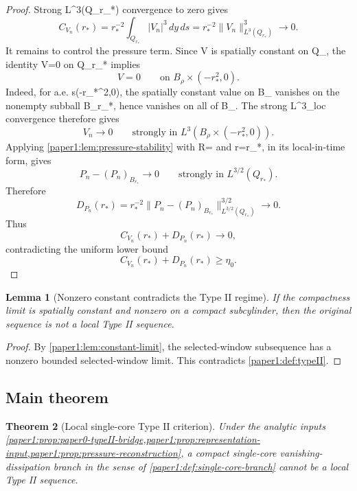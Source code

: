 \documentclass[11pt]{amsart}
\def\({}%
\def\){}%
\theoremstyle{plain}
\newtheorem{theorem}{Theorem}[section]
\newtheorem{lemma}[theorem]{Lemma}
\theoremstyle{definition}
\theoremstyle{remark}
\begin{document}
\begin{proof}
Strong \(L^3(Q_{r_*})\) convergence to zero gives
\[
  C_{V_n}(r_*)
  =
  r_*^{-2}\int_{Q_{r_*}}|V_n|^3\,dy\,ds
  =
  r_*^{-2}\|V_n\|_{L^3(Q_{r_*})}^3
  \to0.
\]
It remains to control the pressure term.  Since \(V\) is spatially constant on
\(Q_\rho\), the identity \(V=0\) on \(Q_{r_*}\) implies
\[
  V=0
  \qquad\text{on }B_\rho\times(-r_*^2,0).
\]
Indeed, for a.e. \(s\in(-r_*^2,0)\), the spatially constant value on
\(B_\rho\) vanishes on the nonempty subball \(B_{r_*}\), hence vanishes on all
of \(B_\rho\).  The strong \(L^3_{\rm loc}\) convergence therefore gives
\[
  V_n\to0
  \qquad\text{strongly in }L^3(B_\rho\times(-r_*^2,0)).
\]
Applying \cref{paper1:lem:pressure-stability} with \(R=\rho\) and \(r=r_*\), in its
local-in-time form, gives
\[
  P_n-(P_n)_{B_{r_*}}\to0
  \qquad\text{strongly in }L^{3/2}(Q_{r_*}).
\]
Therefore
\[
  D_{P_n}(r_*)
  =
  r_*^{-2}
  \|P_n-(P_n)_{B_{r_*}}\|_{L^{3/2}(Q_{r_*})}^{3/2}
  \to0.
\]
Thus
\[
  C_{V_n}(r_*)+D_{P_n}(r_*)\to0,
\]
contradicting the uniform lower bound
\[
  C_{V_n}(r_*)+D_{P_n}(r_*)\ge\eta_0.
\]
\end{proof}

\begin{lemma}[Nonzero constant contradicts the Type II regime]\label{paper1:lem:nonzero-contradiction}
If the compactness limit is spatially constant and nonzero on a compact
subcylinder, then the original sequence is not a local Type II sequence.
\end{lemma}

\begin{proof}
By \cref{paper1:lem:constant-limit}, the selected-window subsequence has a nonzero
bounded selected-window limit.  This contradicts \cref{paper1:def:typeII}.
\end{proof}

\subsection{Main theorem}

\begin{theorem}[Local single-core Type II criterion]\label{paper1:thm:single-core-criterion}
Under the analytic inputs
\cref{paper1:prop:paper0-typeII-bridge,paper1:prop:representation-input,paper1:prop:pressure-reconstruction},
a compact single-core vanishing-dissipation branch in the sense of
\cref{paper1:def:single-core-branch} cannot be a local Type II sequence.
\end{theorem}
\end{document}
